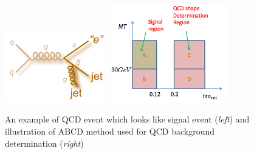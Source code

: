 \begin{figure}[htbp]
	\centering
		\includegraphics[width=0.4\textwidth]{Figures/QCD_diag.png}
		\includegraphics[width=0.45\textwidth]{Figures/QCD_AB.png}		
	\caption[QCD diagram and illustration of QCD background determination]{An example of QCD event which looks like signal event (\textit{left}) and illustration of ABCD method used for QCD background determination (\textit{right})}
	\label{fig:QCD}
\end{figure} 
